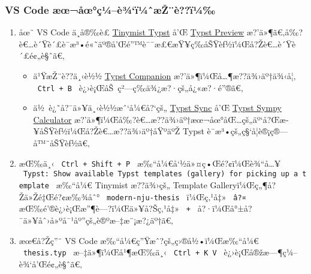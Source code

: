 \subsubsection{VS Code
æœ¬åœ°ç¼--è¾`ï¼ˆæŽ¨è??ï¼‰}\label{vs-code-uxe6ux153uxe5ux153uxe7uxbcuxe8uxbeuxefuxbcux2c6uxe6ux17euxe8uxefuxbc}

\begin{enumerate}
\tightlist
\item
  åœ¨ VS Code ä¸­å®‰è£
  \href{https://marketplace.visualstudio.com/items?itemName=myriad-dreamin.tinymist}{Tinymist
  Typst} å'Œ
  \href{https://marketplace.visualstudio.com/items?itemName=mgt19937.typst-preview}{Typst
  Preview}
  æ?'ä»¶ã€‚å‰?è€\ldots è´Ÿè´£è¯­æ³•é«˜äº®å'Œé''™è¯¯æ£€æŸ¥ç­‰åŠŸèƒ½ï¼Œå?Žè€\ldots è´Ÿè´£é¢„è§ˆã€‚

  \begin{itemize}
  \tightlist
  \item
    ä¹ŸæŽ¨è??ä¸‹è½½
    \href{https://marketplace.visualstudio.com/items?itemName=CalebFiggers.typst-companion}{Typst
    Companion} æ?'ä»¶ï¼Œå\ldots¶æ??ä¾›äº†ä¾‹å¦‚ \texttt{\ Ctrl\ +\ B\ }
    è¿›è¡ŒåŠ~ç²---ç­‰ä¾¿æ?·çš„å¿«æ?·é''®ã€‚
  \item
    ä½~è¿˜å?¯ä»¥ä¸‹è½½æˆ`å¼€å?{}`çš„
    \href{https://marketplace.visualstudio.com/items?itemName=OrangeX4.vscode-typst-sync}{Typst
    Sync} å'Œ
    \href{https://marketplace.visualstudio.com/items?itemName=OrangeX4.vscode-typst-sympy-calculator}{Typst
    Sympy Calculator}
    æ?'ä»¶ï¼Œå‰?è€\ldots æ??ä¾›äº†æœ¬åœ°åŒ\ldots çš„äº`å?Œæ­¥åŠŸèƒ½ï¼Œå?Žè€\ldots æ??ä¾›äº†åŸºäºŽ
    Typst è¯­æ³•çš„ç§`å­¦è®¡ç®---å™¨åŠŸèƒ½ã€‚
  \end{itemize}
\item
  æŒ‰ä¸‹ \texttt{\ Ctrl\ +\ Shift\ +\ P\ }
  æ‰``å¼€å`½ä»¤ç•Œé?¢ï¼Œè¾``å\ldots¥
  \texttt{\ Typst:\ Show\ available\ Typst\ templates\ (gallery)\ for\ picking\ up\ a\ template\ }
  æ‰``å¼€ Tinymist æ??ä¾›çš„ Template Galleryï¼Œç„¶å?Žä»Žé‡Œé?¢æ‰¾åˆ°
  \texttt{\ modern-nju-thesis\ } ï¼Œç‚¹å‡» \texttt{\ â?¤\ }
  æŒ‰é'®è¿›è¡Œæ''¶è---?ï¼Œä»¥å?Šç‚¹å‡» \texttt{\ +\ }
  å?·ï¼Œå°±å?¯ä»¥åˆ›å»ºå¯¹åº''çš„è®ºæ--‡æ¨¡æ?¿äº†ã€‚
\item
  æœ€å?Žç''¨ VS Code æ‰``å¼€ç''Ÿæˆ?çš„ç›®å½•ï¼Œæ‰``å¼€
  \texttt{\ thesis.typ\ } æ--‡ä»¶ï¼Œå¹¶æŒ‰ä¸‹ \texttt{\ Ctrl\ +\ K\ V\ }
  è¿›è¡Œå®žæ---¶ç¼--è¾`å'Œé¢„è§ˆã€‚
\end{enumerate}


